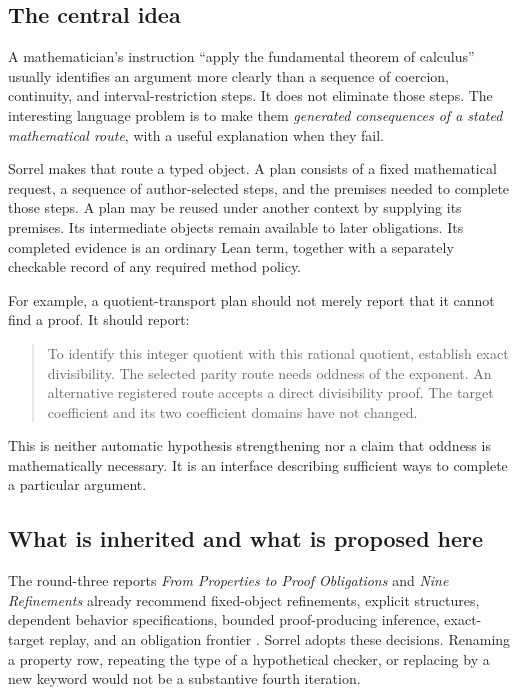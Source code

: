 \documentclass[11pt,a4paper]{article}
\newcommand{\code}[1]{\texttt{\detokenize{#1}}}
\numberwithin{equation}{section}
\theoremstyle{definition}\newtheorem{definition}[theorem]{Definition}
\theoremstyle{remark}\newtheorem{remark}[theorem]{Remark}
\begin{document}
\subsection{The central idea}
A mathematician's instruction ``apply the fundamental theorem of calculus''
usually identifies an argument more clearly than a sequence of coercion,
continuity, and interval-restriction steps. It does not eliminate those steps.
The interesting language problem is to make them \emph{generated consequences
of a stated mathematical route}, with a useful explanation when they fail.

Sorrel makes that route a typed object. A plan consists of a fixed mathematical
request, a sequence of author-selected steps, and the premises needed to
complete those steps. A plan may be reused under another context by supplying
its premises. Its intermediate objects remain available to later obligations.
Its completed evidence is an ordinary Lean term, together with a separately
checkable record of any required method policy.

For example, a quotient-transport plan should not merely report that it cannot
find a proof. It should report:
\begin{quote}
To identify this integer quotient with this rational quotient, establish exact
divisibility. The selected parity route needs oddness of the exponent. An
alternative registered route accepts a direct divisibility proof. The target
coefficient and its two coefficient domains have not changed.
\end{quote}
This is neither automatic hypothesis strengthening nor a claim that oddness is
mathematically necessary. It is an interface describing sufficient ways to
complete a particular argument.

\subsection{What is inherited and what is proposed here}
The round-three reports \emph{From Properties to Proof Obligations} and
\emph{Nine Refinements} already recommend fixed-object refinements, explicit
structures, dependent behavior specifications, bounded proof-producing
inference, exact-target replay, and an obligation frontier
\cite{synA,synB}. Sorrel adopts these decisions. Renaming a property row,
repeating the type of a hypothetical checker, or replacing \code{have} by a
new keyword would not be a substantive fourth iteration.
\end{document}
